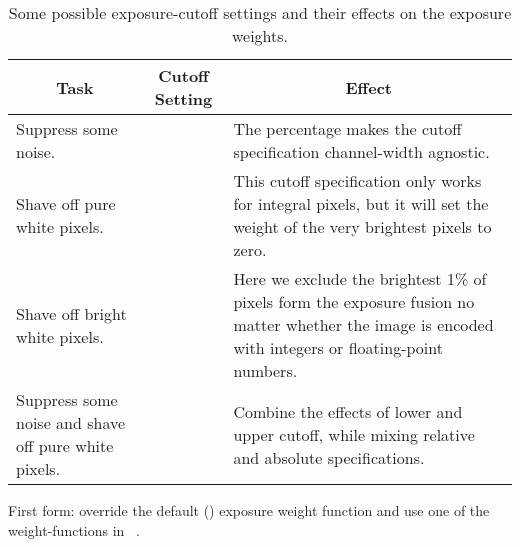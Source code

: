 \begin{codelist}
  \begin{table}[htbp]
    \begin{maxipage}
      \begin{tabular}{p{.3\linewidth}lp{.3\linewidth}}
        \hline
        \multicolumn{1}{c|}{Task} &
        \multicolumn{1}{c|}{Cutoff Setting} &
        \multicolumn{1}{c}{Effect} \\
        \hline\extraheadingsep
        Suppress some noise. & \option{--exposure-cutoff=5\%} & The percentage makes the cutoff
        specification channel-width agnostic. \\

        Shave off pure white pixels. & \option{--exposure-cutoff=0:-1} & This cutoff
        specification only works for integral pixels, but it will set the weight of the very
        brightest pixels to zero. \\

        Shave off bright white pixels. & \option{--exposure-cutoff=0:-1\%} & Here we exclude the
        brightest 1\% of pixels form the exposure fusion no matter whether the image is encoded
        with integers or floating-point numbers. \\

        Suppress some noise and shave off pure white pixels. & \option{--exposure-cutoff=5\%:-1}
        & Combine the effects of lower and upper cutoff, while mixing relative and absolute
        specifications.
      \end{tabular}
    \end{maxipage}

    \caption[Flexible exposure cutoff]{\label{tab:flexible-exposure-cutoff}%
      Some possible exposure-cutoff settings and their effects on the exposure weights.}
  \end{table}


  \label{opt:exposure-weight-function}%
\item[\itempar{--exposure-weight-function=\metavar{WEIGHT-FUNCTION}~\textrm{(\oldstylefirst~form)}
    \\ --exposure-weight-function=\metavar{SHARED-OBJECT}:\feasiblebreak
    \metavar{SYMBOL}\optional{:\feasiblebreak
      \metavar{ARGUMENT}\optional{:\dots}}~\textrm{(\oldstylesecond~form)}}]\itemend
  First form: override the default () exposure weight
  function and use one of the weight-functions in
  \tableName~.


\end{codelist}

